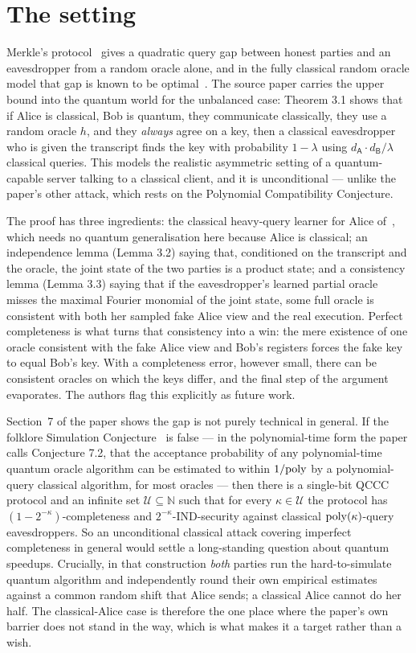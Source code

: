 \documentclass{aicr-conjecture}
\begin{document}
\section{The setting}\label{sec:setting}

Merkle's protocol~\cite{Mer74} gives a quadratic query gap between
honest parties and an eavesdropper from a random oracle alone, and in
the fully classical random oracle model that gap is known to be
optimal~\cite{IR89,BM17}. The source paper carries the upper bound into
the quantum world for the unbalanced case: Theorem 3.1 shows that if
Alice is classical, Bob is quantum, they communicate classically, they
use a random oracle $h$, and they \emph{always} agree on a key, then a
classical eavesdropper who is given the transcript finds the key with
probability $1 - \lambda$ using
$d_{\mathsf{A}} \cdot d_{\mathsf{B}} / \lambda$ classical queries. This
models the realistic asymmetric setting of a quantum-capable server
talking to a classical client, and it is unconditional --- unlike the
paper's other attack, which rests on the Polynomial Compatibility
Conjecture.

The proof has three ingredients: the classical heavy-query learner for
Alice of~\cite{BM17,BKSY11}, which needs no quantum generalisation here
because Alice is classical; an independence lemma (Lemma 3.2) saying
that, conditioned on the transcript and the oracle, the joint state of
the two parties is a product state; and a consistency lemma (Lemma 3.3)
saying that if the eavesdropper's learned partial oracle misses the
maximal Fourier monomial of the joint state, some full oracle is
consistent with both her sampled fake Alice view and the real execution.
Perfect completeness is what turns that consistency into a win: the mere
existence of one oracle consistent with the fake Alice view and Bob's
registers forces the fake key to equal Bob's key. With a completeness
error, however small, there can be consistent oracles on which the keys
differ, and the final step of the argument evaporates. The authors flag
this explicitly as future work.

Section~7 of the paper shows the gap is not purely technical in general.
If the folklore Simulation Conjecture~\cite{AA14} is false --- in the
polynomial-time form the paper calls Conjecture 7.2, that the acceptance
probability of any polynomial-time quantum oracle algorithm can be
estimated to within $1/\mathrm{poly}$ by a polynomial-query classical algorithm,
for most oracles --- then there is a single-bit QCCC protocol and an
infinite set $\mathcal{U} \subseteq \mathbb{N}$ such that for every
$\kappa \in \mathcal{U}$ the protocol has
$(1-2^{-\kappa})$-completeness and $2^{-\kappa}$-IND-security against
classical $\mathrm{poly}(\kappa)$-query eavesdroppers. So an unconditional
classical attack covering imperfect completeness in general would settle
a long-standing question about quantum speedups. Crucially, in that
construction \emph{both} parties run the hard-to-simulate quantum
algorithm and independently round their own empirical estimates against
a common random shift that Alice sends; a classical Alice cannot do her
half. The classical-Alice case is therefore the one place where the
paper's own barrier does not stand in the way, which is what makes it a
target rather than a wish.
\end{document}
